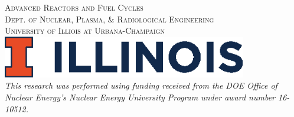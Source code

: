 \begin{titlepage}
    \textsc{\LARGE Advanced Reactors and Fuel Cycles}\\[0.25cm] %
    
    \textsc{\large Dept. of Nuclear, Plasma, \& Radiological Engineering}\\%
    
    \textsc{\large University of Illiois at Urbana-Champaign}\\ %


    
    
    \vspace{0.5cm}
    \includegraphics[width=0.8\textwidth]{illinois}\\[1cm] %
     

    \textit{This research was performed using funding received from the 
    DOE Office of Nuclear Energy's Nuclear Energy University Program under 
    award number 16-10512.} 

\end{titlepage}





